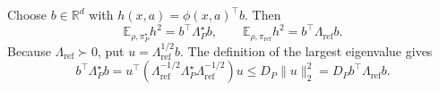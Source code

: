 Choose \(b\in\mathbb R^d\) with \(h(x,a)=\phi(x,a)^\top b\). Then
\[
\mathbb E_{\rho,\pi_P^\star}h^2=b^\top\Lambda_P^\star b,
\qquad
\mathbb E_{\rho,\pi_{\mathrm{ref}}}h^2=b^\top\Lambda_{\mathrm{ref}}b.
\]
Because \(\Lambda_{\mathrm{ref}}\succ0\), put \(u=\Lambda_{\mathrm{ref}}^{1/2}b\). The definition of the largest eigenvalue gives
\[
b^\top\Lambda_P^\star b
=u^\top(\Lambda_{\mathrm{ref}}^{-1/2}\Lambda_P^\star\Lambda_{\mathrm{ref}}^{-1/2})u
\le D_P\|u\|_2^2
=D_Pb^\top\Lambda_{\mathrm{ref}}b.
\]